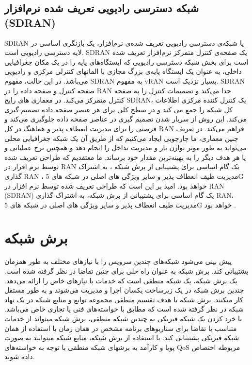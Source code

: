 \subsection{شبکه دسترسی رادیویی تعریف شده نرم‌افزار (SDRAN)}
SDRAN 
یا شبکه‌ی دسترسی رادیویی تعریف‌ شده‌ی نرم‌افزار، یک بازنگری اساسی در لایه دسترسی رادیویی است.
SDRAN
یک صفحه‌ی کنترل متمرکز نرم‌افزار تعریف شده است برای بخش شبکه دسترسی رادیویی که ایستگاه‌های پایه را در یک مکان جغرافیایی داخلی، به عنوان یک ایستگاه پایه‌ی بزرگ مجازی با المانهای کنترلی مرکزی و رادیویی می‌باشد.
در این حالت، مقهوم SDRAN به مفهوم vRAN بسیار نزدیک است.
SDRAN
 صفحه کنترل و صفحه داده را در
 RAN 
 جدا می‌کند و تصمیمات کنترل را به صفحه کنترل متمرکز می‌کند. در معماری های رایج SDRAN، یک کنترل کننده مرکزی اطلاعات کل شبکه را جمع می کند و در سطح کلی برای هر عنصر صفحه داده تصمیم گیری می‌کند. این روش از سربار شدن تصمیم گیری در عناصر صفحه داده جلوگیری می‌کند و فرصتی را برای مدیریت انعطاف پذیر و هماهنگ در کل RAN فراهم می‌کند.
در تعریف چنین معماری، ما چارچوبی ایجاد می‌کنیم که از طریق آن یک شبکه جغرافیایی محلی می‌تواند به طور موثر توازن بار و مدیریت تداخل را انجام دهد و همچنین نرخ عملیاتی و یا هر هدف دیگر را به بهینه‌ترین مقدار خود برساند.
ما معتقدیم که طراحی تعریف شده توسط نرم افزار در RAN یک گام اساسی برای پشتیبانی از برش شبکه ، به اشتراک گذاری RAN ، مدیریت طیف انعطاف پذیر و سایر ویژگی های اصلی در شبکه های 5G خواهد بود.
امید بر این است که طراحی تعریف شده توسط نرم افزار در RAN 
(SDRAN) 
یک گام اساسی برای پشتیبانی از برش شبکه، به اشتراک گذاری RAN، مدیریت طیف انعطاف پذیر و سایر ویژگی های اصلی در شبکه های 5G خواهد بود
\cite{gudipati2013softran,yu2017hsdran}. 

 \section{برش شبکه}
 پیش بینی می‌شود شبکه‌‌های  چندین سرویس را با نیازهای مختلف به طور همزمان پشتیبانی کند.
 برش شبکه
به عنوان راه حلی برای چنین تقاضا در نظر گرفته شده است.
یک برش شبکه، یک شبکه منطقی  است که خدمات  با نیازهای خاص را ارائه می‌دهد.
 چندین برش شبکه
در یک زیرساخت یکسان
  اجرا و مدیریت می‌شوند و
به طور مستقل کار میکنند.
برش شبکه
 با هدف تقسیم منطقی مجموعه توابع و منابع شبکه در یک نهاد شبکه در نظر گرفته شده است که مطابق با خواسته‌‌های فنی یا تجاری خاص می‌باشد.
 با خرد کردن یک شبکه فیزیکی به چندین شبکه منطقی، برش شبکه میتواند از خدمات متناسب با تقاضا برای سناریوهای برنامه مشخص در همان زمان با استفاده از همان شبکه فیزیکی پشتیبانی کند.
با استفاده از برش شبکه، منابع شبکه میتوانند به صورت پویا و کارآمد به برشهای شبکه منطقی با توجه به خواسته‌‌های QoS مربوطه اختصاص داده شوند\cite{NS1}. 

